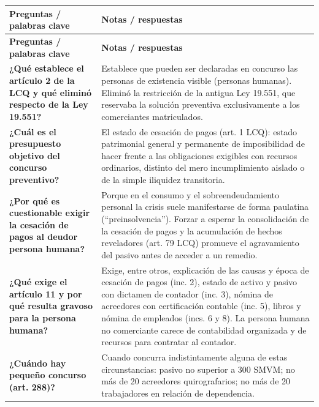 \documentclass[12pt,oneside]{book}
\begin{document}
\begin{longtable}{
    >{\raggedright\arraybackslash}p{}
    >{\raggedright\arraybackslash}p{}
}
\toprule
\textbf{Preguntas / palabras clave} & \textbf{Notas / respuestas} \\
\midrule
\endfirsthead
\toprule
\textbf{Preguntas / palabras clave} & \textbf{Notas / respuestas} \\
\midrule
\endhead
\bottomrule
\endfoot

\textbf{¿Qué establece el artículo 2 de la LCQ y qué eliminó respecto de la Ley 19.551?} &
Establece que pueden ser declaradas en concurso las personas de existencia visible (personas humanas). Eliminó la restricción de la antigua Ley 19.551, que reservaba la solución preventiva exclusivamente a los comerciantes matriculados. \\[0.6em]

\textbf{¿Cuál es el presupuesto objetivo del concurso preventivo?} &
El estado de cesación de pagos (art. 1 LCQ): estado patrimonial general y permanente de imposibilidad de hacer frente a las obligaciones exigibles con recursos ordinarios, distinto del mero incumplimiento aislado o de la simple iliquidez transitoria. \\[0.6em]

\textbf{¿Por qué es cuestionable exigir la cesación de pagos al deudor persona humana?} &
Porque en el consumo y el sobreendeudamiento personal la crisis suele manifestarse de forma paulatina (``preinsolvencia''). Forzar a esperar la consolidación de la cesación de pagos y la acumulación de hechos reveladores (art. 79 LCQ) promueve el agravamiento del pasivo antes de acceder a un remedio. \\[0.6em]

\textbf{¿Qué exige el artículo 11 y por qué resulta gravoso para la persona humana?} &
Exige, entre otros, explicación de las causas y época de cesación de pagos (inc. 2), estado de activo y pasivo con dictamen de contador (inc. 3), nómina de acreedores con certificación contable (inc. 5), libros y nómina de empleados (incs. 6 y 8). La persona humana no comerciante carece de contabilidad organizada y de recursos para contratar al contador. \\[0.6em]

\textbf{¿Cuándo hay pequeño concurso (art. 288)?} &
Cuando concurra indistintamente alguna de estas circunstancias: pasivo no superior a 300 SMVM; no más de 20 acreedores quirografarios; no más de 20 trabajadores en relación de dependencia. \\[0.6em]


\end{longtable}
\end{document}

